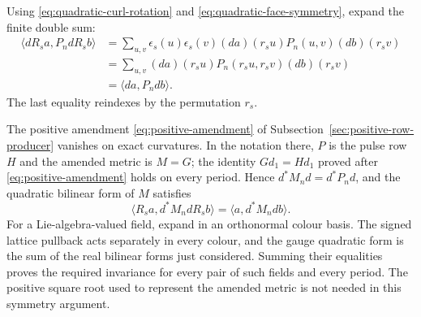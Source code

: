 Using \eqref{eq:quadratic-curl-rotation} and
\eqref{eq:quadratic-face-symmetry}, expand the finite double sum:
\begin{align*}
 \langle dR_sa,P_n dR_sb\rangle
 &=\sum_{u,v}\epsilon_s(u)\epsilon_s(v)
          (da)(r_su)P_n(u,v)(db)(r_sv)\\
 &=\sum_{u,v}(da)(r_su)P_n(r_su,r_sv)(db)(r_sv)\\
 &=\langle da,P_n db\rangle.
\end{align*}
The last equality reindexes by the permutation $r_s$.

The positive amendment \eqref{eq:positive-amendment} of
Subsection~\ref{sec:positive-row-producer} vanishes on exact curvatures.
In the notation there, $P$ is the pulse row $H$ and the amended metric
is $M=G$; the identity $Gd_1=Hd_1$ proved after
\eqref{eq:positive-amendment} holds on every period. Hence
$d^*M_nd=d^*P_nd$, and the quadratic bilinear form of $M$ satisfies
\[
          \langle R_sa,d^*M_ndR_sb\rangle
                        =\langle a,d^*M_ndb\rangle.
\]
For a Lie-algebra-valued field, expand in an orthonormal colour basis.
The signed lattice pullback acts separately in every colour, and the
gauge quadratic form is the sum of the real bilinear forms just
considered. Summing their equalities proves the required invariance
for every pair of such fields and every period. The positive square
root used to represent the amended metric is not needed in this
symmetry argument.
